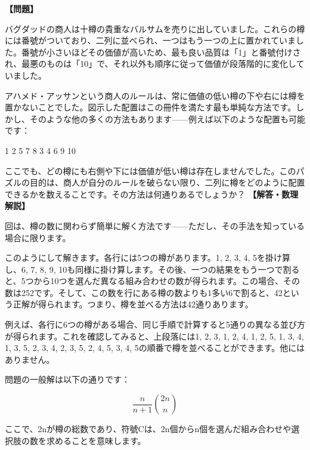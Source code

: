 \documentclass[10pt,a4paper,oneside,openany]{ltjsbook}
\begin{document}
\begin{tcolorbox}[colback=softblue,colframe=primaryblue,title=\textbf{第 279 問：THE BARRELS OF BALSAM.},arc=2mm,boxrule=1pt,breakable]
\textbf{【問題】}\par\vspace{0.3em}
バグダッドの商人は十樽の貴重なバルサムを売りに出していました。これらの樽には番號がついており、二列に並べられ、一つはもう一つの上に置かれていました。番號が小さいほどその価値が高いため、最も良い品質は「1」と番號付けされ、最悪のものは「10」で、それ以外も順序に従って価値が段落階的に変化していました。

アハメド・アッサンという商人のルールは、常に価値の低い樽の下や右には樽を置かないことでした。図示した配置はこの冊件を満たす最も単純な方法です。しかし、そのような他の多くの方法もあります——例えば以下のような配置も可能です：

    1  2  5  7  8
    3  4  6  9 10

ここでも、どの樽にも右側や下には価値が低い樽は存在しませんでした。このパズルの目的は、商人が自分のルールを破らない限り、二列に樽をどのように配置できるかを数えることです。その方法は何通りあるでしょうか？
\tcblower
\textbf{【解答・数理解説】}\par\vspace{0.3em}
回は、樽の数に関わらず簡単に解く方法です——ただし、その手法を知っている場合に限ります。

このようにして解きます。各行には5つの樽があります。1, 2, 3, 4, 5を掛け算し、6, 7, 8, 9, 10も同様に掛け算します。その後、一つの結果をもう一つで割ると、5つから10つを選んだ異なる組み合わせの数が得られます。この場合、その数は252です。そして、この数を行にある樽の数よりも1多い6で割ると、42という正解が得られます。つまり、樽を並べる方法は42通りあります。

例えば、各行に6つの樽がある場合、同じ手順で計算すると5通りの異なる並び方が得られます。これを確認してみると、上段落には1, 2, 3, 1, 2, 4, 1, 2, 5, 1, 3, 4, 1, 3, 5, 2, 3, 4, 2, 3, 5, 2, 4, 5, 3, 4, 5の順番で樽を並べることができます。他にはありません。

問題の一般解は以下の通りです：

\[
\frac{n}{n+1} \binom{2n}{n}
\]

ここで、2nが樽の総数であり、符號Cは、2n個からn個を選んだ組み合わせや選択肢の数を求めることを意味します。
\end{tcolorbox}
\end{document}
